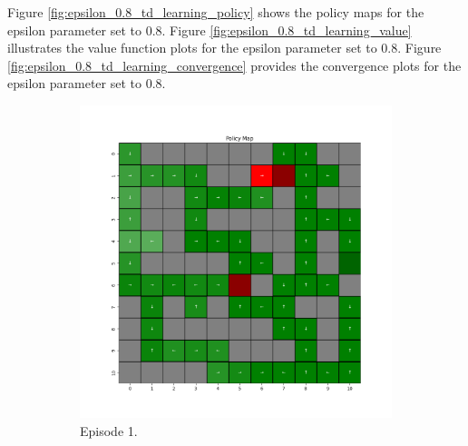 \documentclass{assignment}
\begin{document}
Figure \ref{fig:epsilon_0.8_td_learning_policy} shows the policy maps for the epsilon parameter set to 0.8. Figure \ref{fig:epsilon_0.8_td_learning_value} illustrates the value function plots for the epsilon parameter set to 0.8. Figure \ref{fig:epsilon_0.8_td_learning_convergence} provides the convergence plots for the epsilon parameter set to 0.8.

\begin{figure}[H]
    \begin{subfigure}{0.3\textwidth}
        \includegraphics[width=\textwidth]{figures/policy_td/epsilon_sweep/policy_alpha_0.1_gamma_0.95_epsilon_0.8_iteration_1.png}
    \caption{Episode 1.}
    \end{subfigure}\hfill
    \begin{subfigure}{0.3\textwidth}

\end{subfigure}
\end{figure}
\end{document}
